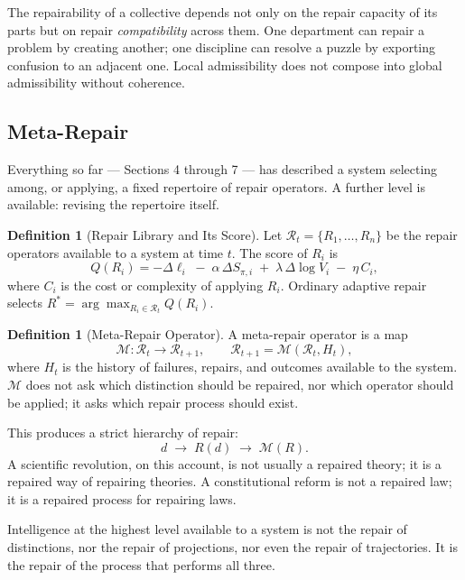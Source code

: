 \documentclass[11pt]{article}
\theoremstyle{plain}
\theoremstyle{definition}
\newtheorem{definition}[theorem]{Definition}
\theoremstyle{remark}
\begin{document}
\begin{tcolorbox}[title=Coordination Repair Principle]
The repairability of a collective depends not only on the repair capacity of its parts but on repair \emph{compatibility} across them. One department can repair a problem by creating another; one discipline can resolve a puzzle by exporting confusion to an adjacent one. Local admissibility does not compose into global admissibility without coherence.
\end{tcolorbox}

\subsection{Meta-Repair}

Everything so far --- Sections 4 through 7 --- has described a system selecting among, or applying, a fixed repertoire of repair operators. A further level is available: revising the repertoire itself.

\begin{definition}[Repair Library and Its Score]
Let $\mathcal{R}_t = \{R_1,\dots,R_n\}$ be the repair operators available to a system at time $t$. The score of $R_i$ is
\[
Q(R_i) = -\Delta\ell_i \;-\; \alpha\,\Delta S_{\pi,i} \;+\; \lambda\,\Delta \log V_i \;-\; \eta\, C_i,
\]
where $C_i$ is the cost or complexity of applying $R_i$. Ordinary adaptive repair selects $R^\ast = \arg\max_{R_i \in \mathcal{R}_t} Q(R_i)$.
\end{definition}

\begin{definition}[Meta-Repair Operator]
A meta-repair operator is a map
\[
\mathcal{M} : \mathcal{R}_t \to \mathcal{R}_{t+1}, \qquad \mathcal{R}_{t+1} = \mathcal{M}(\mathcal{R}_t, H_t),
\]
where $H_t$ is the history of failures, repairs, and outcomes available to the system. $\mathcal{M}$ does not ask which distinction should be repaired, nor which operator should be applied; it asks which repair process should exist.
\end{definition}

This produces a strict hierarchy of repair:
\[
d \;\to\; R(d) \;\to\; \mathcal{M}(R).
\]
A scientific revolution, on this account, is not usually a repaired theory; it is a repaired way of repairing theories. A constitutional reform is not a repaired law; it is a repaired process for repairing laws.

\begin{tcolorbox}[title=HYDRA Principle]
Intelligence at the highest level available to a system is not the repair of distinctions, nor the repair of projections, nor even the repair of trajectories. It is the repair of the process that performs all three.
\end{tcolorbox}
\end{document}
